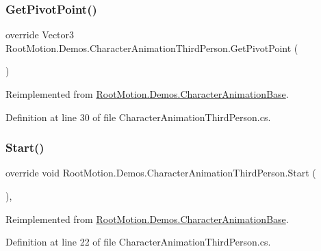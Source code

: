 \subsubsection{\texorpdfstring{Get\+Pivot\+Point()}{GetPivotPoint()}}
{\footnotesize\ttfamily override Vector3 Root\+Motion.\+Demos.\+Character\+Animation\+Third\+Person.\+Get\+Pivot\+Point (\begin{DoxyParamCaption}{ }\end{DoxyParamCaption})\hspace{0.3cm}{\ttfamily [virtual]}}



Reimplemented from \mbox{\hyperlink{class_root_motion_1_1_demos_1_1_character_animation_base_a223adef755549b4989920036a2a164cd}{Root\+Motion.\+Demos.\+Character\+Animation\+Base}}.



Definition at line 30 of file Character\+Animation\+Third\+Person.\+cs.

\mbox{\label{class_root_motion_1_1_demos_1_1_character_animation_third_person_a1cdf638262be99e19f767b42aa2a9a9a}} 
\subsubsection{\texorpdfstring{Start()}{Start()}}
{\footnotesize\ttfamily override void Root\+Motion.\+Demos.\+Character\+Animation\+Third\+Person.\+Start (\begin{DoxyParamCaption}{ }\end{DoxyParamCaption})\hspace{0.3cm}{\ttfamily [protected]}, {\ttfamily [virtual]}}



Reimplemented from \mbox{\hyperlink{class_root_motion_1_1_demos_1_1_character_animation_base_a4ddfae1bf92b14f0f1bb9ddd56ed093d}{Root\+Motion.\+Demos.\+Character\+Animation\+Base}}.



Definition at line 22 of file Character\+Animation\+Third\+Person.\+cs.

\mbox{\label{class_root_motion_1_1_demos_1_1_character_animation_third_person_a8b82eaa4dd58a3f25722713ba6092789}} 
